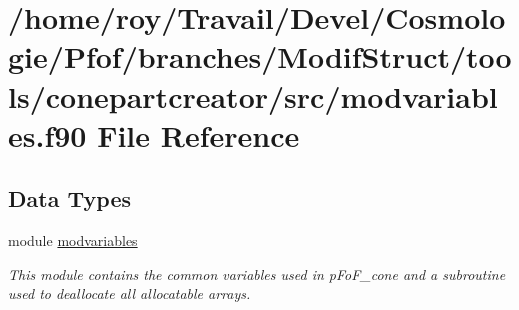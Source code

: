 \hypertarget{tools_2conepartcreator_2src_2modvariables_8f90}{\section{/home/roy/\-Travail/\-Devel/\-Cosmologie/\-Pfof/branches/\-Modif\-Struct/tools/conepartcreator/src/modvariables.f90 File Reference}
\label{tools_2conepartcreator_2src_2modvariables_8f90}
}
\subsection*{Data Types}
\begin{DoxyCompactItemize}
\item 
module \hyperlink{classmodvariables}{modvariables}
\begin{DoxyCompactList}\small\item\em This module contains the common variables used in p\-Fo\-F\-\_\-cone and a subroutine used to deallocate all allocatable arrays. \end{DoxyCompactList}\end{DoxyCompactItemize}
